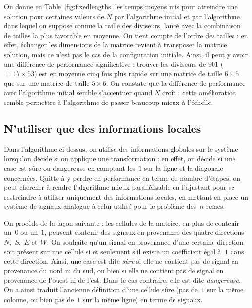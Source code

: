 On donne en Table~\ref{fig:fixedlengths} les temps moyens mis pour atteindre une
solution  pour  certaines  valeurs  de  $N$  par  l'algorithme  initial  et  par
l'algorithme dans lequel  on suppose connue la taille  des diviseurs, lancé avec
la  combinaison de  tailles la  plus favorable  en moyenne.  On tient  compte de
l'ordre des tailles : en effet,  échanger les dimensions de la matrice revient à
transposer la  matrice solution, mais  ce n'est pas  le cas de  la configuration
initiale. Ainsi, il  peut y avoir une différence  de performance significative :
trouver les diviseurs  de $901$ ($=17 \times 53$) est en  moyenne cinq fois plus
rapide sur une  matrice de taille $6\times  5$ que sur une matrice  de taille $5
\times  6$.  On  constate que  la  différence de  performance avec  l'algorithme
initial semble s'accentuer quand $N$ croît : cette amélioration semble permettre
à l'algorithme de passer beaucoup mieux à l'échelle.

\subsection{N'utiliser que des informations locales}

Dans l'algorithme ci-dessus, on utilise des informations globales sur le système lorsqu'on décide si on applique une transformation : en effet, on décide si une case est sûre ou dangereuse en comptant les~$1$ sur la ligne et la diagonale concernées. Quitte à y perdre en performance en terme de nombre d'étapes, on peut chercher à rendre l'algorithme mieux parallélisable en l'ajustant pour se restreindre à utiliser uniquement des informations locales, en mettant en place un système de signaux analogue à celui utilisé pour le problème des~$n$ reines. 

On procède de la façon suivante : les cellules de la matrice, en plus de contenir un~$0$ ou un~$1$, peuvent contenir des signaux en provenance des quatre directions~$N$,~$S$,~$E$ et~$W$. On souhaite qu'un signal en provenance d'une certaine direction soit présent sur une cellule si et seulement s'il existe un coefficient égal à~$1$ dans cette direction. Ainsi, une case est dite \emph{sûre} si elle ne contient pas de signal en provenance du nord ni du sud, ou bien si elle ne contient pas de signal en provenance de l'ouest ni de l'est. Dans le cas contraire, elle est dite \emph{dangereuse}. On a ainsi traduit l'ancienne définition d'une cellule sûre (pas de~$1$ sur la même colonne, ou bien pas de~$1$ sur la même ligne) en terme de signaux.

